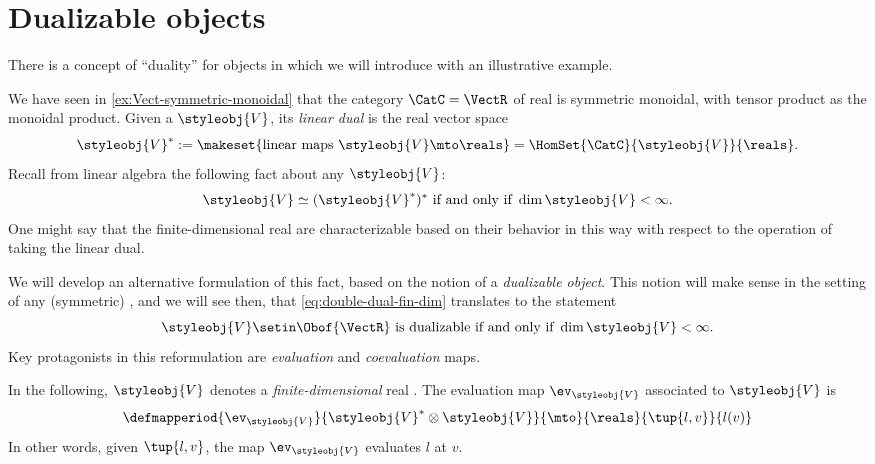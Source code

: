 
\section{Dualizable objects}
\label{sec:dual-objects}
There is a concept of ``duality'' for objects in  which we will introduce with an illustrative example.

We have seen in \cref{ex:Vect-symmetric-monoidal} that the category $\CatC = \VectR$ of real  is symmetric monoidal, with tensor product as the monoidal product.
Given a  $\styleobj{V} $, its \emph{linear dual} is the real vector space
\begin{equation}
    \label{eq:lin-dual-vecsp}
    \styleobj{V} ^{*} := \makeset{ \text{linear maps } \styleobj{V} \mto \reals } = \HomSet{\CatC}{\styleobj{V}}{ \reals}.
\end{equation}
%
Recall from linear algebra the following fact about any  $\styleobj{V} $:
%
\begin{equation}
    \label{eq:double-dual-fin-dim}
    \styleobj{V} \simeq (\styleobj{V} ^{*})^* \text{ if and only if } \dim \styleobj{V} < \infty.
\end{equation}
%
One might say that the finite-dimensional real  are characterizable based on their behavior in this way with respect to the operation of taking the linear dual.

We will develop an alternative formulation of this fact, based on the notion of a \emph{dualizable object}.
This notion will make sense in the setting of any (symmetric) , and we will see then, that \cref{eq:double-dual-fin-dim} translates to the statement
\begin{equation}
    \label{eq:dualizable-fin-dim}
    \styleobj{V} \setin \Obof{\VectR} \text{ is dualizable if and only if } \dim \styleobj{V} < \infty.
\end{equation}
%
Key protagonists in this reformulation are \emph{evaluation} and \emph{coevaluation} maps.

In the following, $\styleobj{V} $ denotes a \emph{finite-dimensional} real .
The evaluation map $\ev_\styleobj{V} $ associated to $\styleobj{V} $ is
\begin{equation}
    \label{eq:evaluation-vecsp}
    \defmapperiod{
        \ev_\styleobj{V}
    }{
        \styleobj{V}^* \otimes \styleobj{V}
    }{
        \mto
    }{
        \reals
    }{
        \tup{l, v}
    }{
        l(v)
    }
\end{equation}
In other words, given $\tup{l, v}$, the map $\ev_\styleobj{V} $ evaluates $l$ at $v$.

